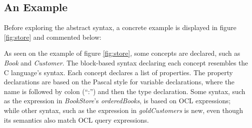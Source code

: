 \subsection{An Example}\label{subsec:example}

Before exploring the abstract syntax, a concrete example is displayed in figure \ref{fig:store} and commented below:

\pagebreak



As seen on the example of figure \ref{fig:store}, some concepts are declared, such as \emph{Book} and \emph{Customer}. 
The block-based syntax declaring each concept resembles the C \cite{clang} language's syntax. 
Each concept declares a list of properties.
The property declarations are based on the Pascal \cite{pascal} style for variable declarations, where the name is followed by colon (``:'') and then the type declaration.
Some syntax, such as the expression in \emph{BookStore}'s \emph{orderedBooks}, is based on OCL \cite{ocl} expressions; while other syntax, such as the expression in \emph{goldCustomers} is new, even though its semantics also match OCL \cite{ocl} query expressions.
